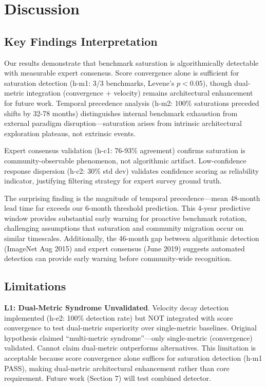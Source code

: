 \section{Discussion}

\subsection{Key Findings Interpretation}

Our results demonstrate that benchmark saturation is algorithmically detectable with measurable expert consensus. Score convergence alone is sufficient for saturation detection (h-m1: 3/3 benchmarks, Levene's $p<0.05$), though dual-metric integration (convergence + velocity) remains architectural enhancement for future work. Temporal precedence analysis (h-m2: 100\% saturations preceded shifts by 32-78 months) distinguishes internal benchmark exhaustion from external paradigm disruption---saturation arises from intrinsic architectural exploration plateaus, not extrinsic events.

Expert consensus validation (h-c1: 76-93\% agreement) confirms saturation is community-observable phenomenon, not algorithmic artifact. Low-confidence response dispersion (h-c2: 30\% std dev) validates confidence scoring as reliability indicator, justifying filtering strategy for expert survey ground truth.

The surprising finding is the magnitude of temporal precedence---mean 48-month lead time far exceeds our 6-month threshold prediction. This 4-year predictive window provides substantial early warning for proactive benchmark rotation, challenging assumptions that saturation and community migration occur on similar timescales. Additionally, the 46-month gap between algorithmic detection (ImageNet Aug 2015) and expert consensus (June 2019) suggests automated detection can provide early warning before community-wide recognition.

\subsection{Limitations}

\textbf{L1: Dual-Metric Syndrome Unvalidated}. Velocity decay detection implemented (h-e2: 100\% detection rate) but NOT integrated with score convergence to test dual-metric superiority over single-metric baselines. Original hypothesis claimed ``multi-metric syndrome''---only single-metric (convergence) validated. Cannot claim dual-metric outperforms alternatives. This limitation is acceptable because score convergence alone suffices for saturation detection (h-m1 PASS), making dual-metric architectural enhancement rather than core requirement. Future work (Section 7) will test combined detector.

